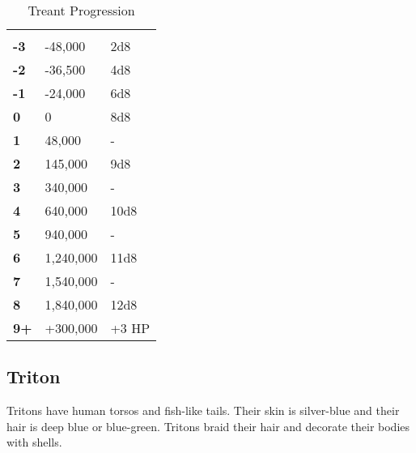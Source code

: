 \begin{multicols*}{2}
\begin {table}[H]
  \caption{Treant Progression}
  \begin{tabularx}{\columnwidth}{>{\bfseries}YYY}
   &  & \\
	-3 & -48,000 & 2d8\\
	-2 & -36,500 & 4d8\\
	-1 & -24,000 & 6d8\\
	0 & 0 & 8d8\\
	1 & 48,000 & -\\
	2 & 145,000 & 9d8\\
	3 & 340,000 & -\\
	4 & 640,000 & 10d8\\
	5 & 940,000 & -\\
	6 & 1,240,000 & 11d8\\
	7 & 1,540,000 & -\\
	8 & 1,840,000 & 12d8\\
	9+ & +300,000 & +3 HP
  \end {tabularx}
\end {table}

\subsection{Triton}

Tritons have human torsos and fish-like tails. Their skin is silver-blue and their hair is deep blue or blue-green. Tritons braid their hair and decorate their bodies with shells.


\end{multicols*}
